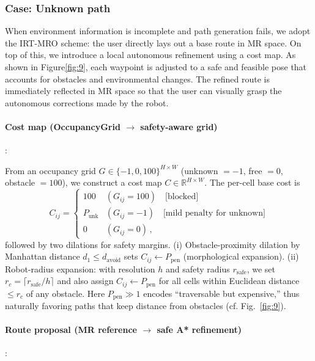 \documentclass[../../main.tex]{subfiles} %
\begin{document}
\subsubsection{Case: Unknown path} 
When environment information is incomplete and path generation fails, we adopt the IRT-MRO \cite{Esaki} scheme:  
the user directly lays out a base route in MR space.  
On top of this, we introduce a local autonomous refinement using a cost map.  
As shown in Figure\ref{fig:9}, each waypoint is adjusted to a safe and feasible pose that accounts 
for obstacles and environmental changes.  
The refined route is immediately reflected in MR space so that the user can visually 
grasp the autonomous corrections made by the robot.


\paragraph{Cost map (OccupancyGrid $\rightarrow$ safety-aware grid)}:

From an occupancy grid $G\in\{-1,0,100\}^{H\times W}$ (unknown $=-1$, free $=0$, obstacle $=100$),
we construct a cost map $C\in\mathbb{R}^{H\times W}$.
The per-cell base cost is
\[
C_{ij}=
\begin{cases}
100 & (G_{ij}=100)\quad \text{[blocked]}\\
P_{\text{unk}} & (G_{ij}=-1)\quad \text{[mild penalty for unknown]}\\
0 & (G_{ij}=0)\,,
\end{cases}
\]
followed by two dilations for safety margins.
(i) Obstacle-proximity dilation by Manhattan distance $d_1\le d_{\text{avoid}}$ sets
$C_{ij}\leftarrow P_{\text{pen}}$ (morphological expansion).
(ii) Robot-radius expansion: with resolution $h$ and safety radius $r_{\text{safe}}$,
we set $r_c=\lceil r_{\text{safe}}/h\rceil$ and also assign
$C_{ij}\leftarrow P_{\text{pen}}$ for all cells within Euclidean distance $\le r_c$ of any obstacle.
Here $P_{\text{pen}}\!\gg\!1$ encodes “traversable but expensive,” thus naturally favoring
paths that keep distance from obstacles (cf. Fig.~\ref{fig:9}).

\paragraph{Route proposal (MR reference $\rightarrow$ safe A* refinement)}:
\end{document}
